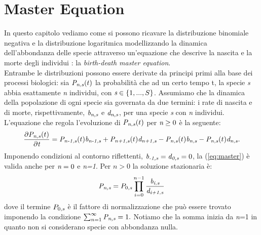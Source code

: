 \chapter{Master Equation}\label{ch:MasterEquation}
In questo capitolo vediamo come si possono ricavare la distribuzione binomiale negativa e la distribuzione logaritmica modellizzando la dinamica dell'abbondanza delle specie attraverso un'equazione che descrive la nascita e la morte degli individui : la \emph{birth-death master equation}.\\
Entrambe le distribuzioni possono essere derivate da principi primi alla base dei processi biologici: sia $\emph{P}_{\emph{n,s}}(t)$ la probabilità che ad un certo tempo t, la specie \emph{s} abbia esattamente \emph{n} individui, con $\emph{s}\in\left \{ 1,...,S \right \}$. Assumiamo che la dinamica della popolazione di ogni specie sia governata da due termini: i rate di nascita e di morte, rispettivamente, $\emph{b}_\emph{{n,s}}$ e $\emph{d}_\emph{{n,s}}$, per una specie \emph{s} con \emph{n} individui.
L'equazione che regola l'evoluzione di $\emph{P}_{\emph{n,s}}(t)$ per $\emph{n}\ge0$ è la seguente:
\begin{equation}
\frac{\partial\emph{P}_{\emph{n,s}}(t)}{\partial\emph{t}}=
\emph{P}_{\emph{n-1,s}}(t)\emph{b}_\emph{{n-1,s}}+\emph{P}_{\emph{n+1,s}}(t)\emph{d}_\emph{{n+1,s}}-\emph{P}_{\emph{n,s}}(t)\emph{b}_\emph{{n,s}}-\emph{P}_{\emph{n,s}}(t)\emph{d}_\emph{{n,s}}.
\label{eq:master}
\end{equation}
Imponendo condizioni al contorno riflettenti, $\emph{b}_\emph{{-1,s}}=\emph{d}_\emph{{0,s}}=0$, la (\ref{eq:master}) è valida anche per $\emph{n}=0$ e \emph{n=1}. Per $n>0$ la soluzione stazionaria è:
\begin{equation}
\emph{P}_{\emph{n,s}}=P_{0,\emph{s}}\prod_{i=0}^{n-1}\frac{\emph{b}_\emph{{i,s}}}{\emph{d}_\emph{{i+1,s}}}
\label{eq:steadystate}
\end{equation}
dove il termine $P_{0,\emph{s}}$ è il fattore di normalizzazione che può essere trovato imponendo la condizione $\sum_{n=1}^\infty \emph{P}_{\emph{n,s}}=1.$ Notiamo che la somma inizia da \emph{n}=1 in quanto non si considerano specie con abbondanza nulla.\\



